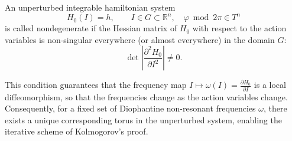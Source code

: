 An unperturbed integrable hamiltonian system
$$H_0(I) = h, \qquad I \in G \subset \mathbb{R}^n, \quad \varphi \bmod 2\pi \in T^n$$
is called nondegenerate if the Hessian matrix of $H_0$ with respect to the action variables is non-singular everywhere (or almost everywhere) in the domain $G$:
$$\det \left| \frac{\partial^2 H_0}{\partial I^2} \right| \neq 0.$$

This condition guarantees that the frequency map $I \mapsto \omega(I) = \frac{\partial H_0}{\partial I}$ is a local diffeomorphism, so that the frequencies change as the action variables change. Consequently, for a fixed set of Diophantine non-resonant frequencies $\omega$, there exists a unique corresponding torus in the unperturbed system, enabling the iterative scheme of Kolmogorov's proof.
